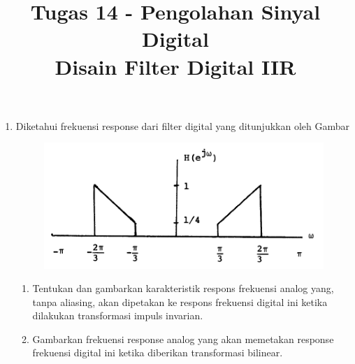 \documentclass[12pt,a4paper]{article}
\title{Tugas 14 - Pengolahan Sinyal Digital\\
	Disain Filter Digital IIR}
\date{}
\begin{document}
	\maketitle
	\date{}
	\begin{enumerate}
		\item Diketahui frekuensi response dari filter digital yang ditunjukkan oleh Gambar 
		
		\begin{figure}[H]
			\centering
			\includegraphics[width=0.7\linewidth]{img/img01}
			\caption{}
			\label{fig:img01}
		\end{figure}
		
		\begin{enumerate}
			\item Tentukan dan gambarkan karakteristik respons frekuensi analog yang, tanpa aliasing, akan dipetakan ke respons frekuensi digital ini ketika dilakukan transformasi impuls invarian.
			\item Gambarkan frekuensi response analog yang akan memetakan response frekuensi digital ini ketika diberikan transformasi bilinear.
		\end{enumerate}
	
	\end{enumerate}
\end{document}
